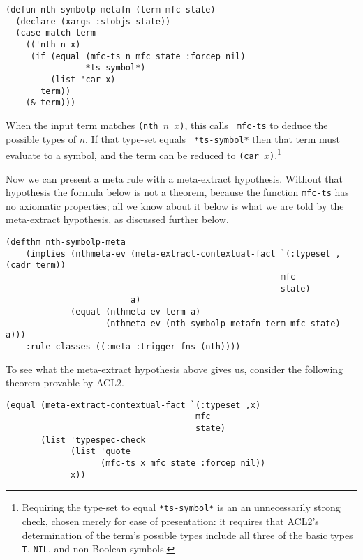 \begin{verbatim}
(defun nth-symbolp-metafn (term mfc state)
  (declare (xargs :stobjs state))
  (case-match term
    (('nth n x)
     (if (equal (mfc-ts n mfc state :forcep nil)
                *ts-symbol*)
         (list 'car x)
       term))
    (& term)))
\end{verbatim}

\noindent When the input term matches {\tt (nth $n$ $x$)}, this calls
\href{http://www.cs.utexas.edu/users/moore/acl2/manuals/current/manual/index.html?topic=ACL2\_\_\_\_MFC-TS}{\underline{\tt
    mfc-ts}}
to deduce the possible types of $n$.  If that type-set equals {\tt
  *ts-symbol*} then that term must evaluate to a symbol, and the term
can be reduced to {\tt (car $x$)}.\footnote{Requiring the type-set to
  equal \texttt{*ts-symbol*} is an an unnecessarily strong check,
  chosen merely for ease of presentation: it requires that ACL2's
  determination of the term's possible types include all three of the
  basic
  types {\tt T}, {\tt NIL}, and non-Boolean symbols.}

Now we can present a meta rule with a meta-extract
hypothesis.  Without that hypothesis the formula below is
not a theorem, because the function {\tt mfc-ts} has no axiomatic
properties; all we know about it below is what we are told by the
meta-extract hypothesis, as discussed further below.

\begin{verbatim}
(defthm nth-symbolp-meta
    (implies (nthmeta-ev (meta-extract-contextual-fact `(:typeset ,(cadr term))
                                                       mfc
                                                       state)
                         a)
             (equal (nthmeta-ev term a)
                    (nthmeta-ev (nth-symbolp-metafn term mfc state) a)))
    :rule-classes ((:meta :trigger-fns (nth))))
\end{verbatim}

\noindent To see what the meta-extract hypothesis above gives us, consider the
following theorem provable by ACL2.

\begin{verbatim}
(equal (meta-extract-contextual-fact `(:typeset ,x)
                                      mfc
                                      state)
       (list 'typespec-check
             (list 'quote
                   (mfc-ts x mfc state :forcep nil))
             x))
\end{verbatim}

